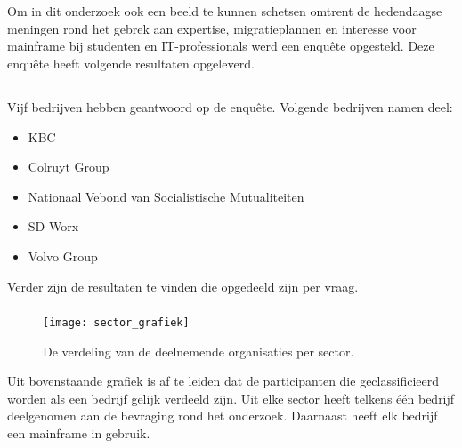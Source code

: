  
 \section{}
 \label{sec:De resultaten van de bevraging}
 
 Om in dit onderzoek ook een beeld te kunnen schetsen omtrent de hedendaagse meningen rond het gebrek aan expertise, migratieplannen en interesse voor mainframe bij studenten en IT-professionals werd een enquête opgesteld. Deze enquête heeft volgende resultaten opgeleverd.
 
  \subsection{}
 \label{sec:De resultaten van de bevraging}

Vijf bedrijven hebben geantwoord op de enquête. Volgende bedrijven namen deel: 
 \begin{itemize}
    \item KBC
    \item Colruyt Group
    \item Nationaal Vebond van Socialistische Mutualiteiten
    \item SD Worx
    \item Volvo Group
\end{itemize}

Verder zijn de resultaten te vinden die opgedeeld zijn per vraag. 

 \subsubsection{}
\label{sec:In welke sector is het bedrijf actief}

 \begin{figure}[h]
    \centering
    \texttt{[image: sector\_grafiek]}
    \caption{De verdeling van de deelnemende organisaties per sector.}
\end{figure}

Uit bovenstaande grafiek is af te leiden dat de participanten die geclassificieerd worden als een bedrijf gelijk verdeeld zijn. Uit elke sector heeft telkens één bedrijf deelgenomen aan de bevraging rond het onderzoek. Daarnaast heeft elk bedrijf een mainframe in gebruik. 


